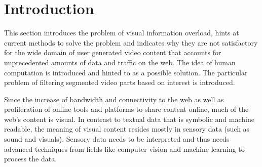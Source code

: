\chapter{Introduction}
\label{ch:introduction}

This section introduces the problem of visual information overload, hints at current methods to solve the problem and indicates why they are not satisfactory for the wide domain of user generated video content that accounts for unprecedented amounts of data and traffic on the web. The idea of human computation is introduced and hinted to as a possible solution. The particular problem of filtering segmented video parts based on interest is introduced.

Since the increase of bandwidth and connectivity to the web as well as proliferation of online tools and platforms to share content online, much of the web's content is visual. In contrast to textual data that is symbolic and machine readable, the meaning of visual content resides mostly in sensory data (such as sound and visuals). Sensory data needs to be interpreted and thus needs advanced techniques from fields like computer vision and machine learning to process the data.




